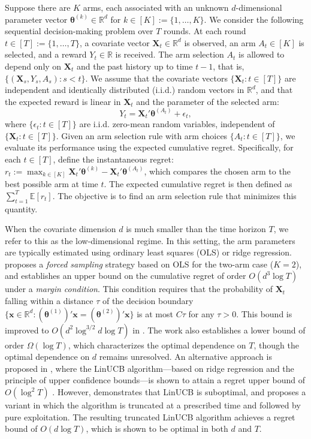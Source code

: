 \documentclass[aos,preprint]{imsart}
\theoremstyle{plain}
\theoremstyle{definition}
\newcommand{\btheta}{\boldsymbol{\theta}}
\newcommand{\bX}{\boldsymbol{X}}
\newcommand{\bx}{\boldsymbol{x}}
\newcommand{\bR}{\mathbb{R}}
\begin{document}
Suppose there are $K$ arms, each associated with an unknown $d$-dimensional parameter vector $\btheta^{(k)} \in \bR^{d}$ for $k \in [K] := \{1,\ldots, K\}$. We consider the following sequential decision-making problem over $T$ rounds. At each round $t \in [T] := \{1,\ldots,T\}$, a covariate vector $\bX_t \in \bR^{d}$ is observed, an arm $A_t \in [K]$ is selected, and a reward $Y_t \in \bR$ is received. The arm selection $A_t$ is allowed to depend only on $\bX_t$ and the past history up to time $t-1$, that is, $\{(\bX_s, Y_s, A_s) : s < t\}$. We assume that the covariate vectors $\{\bX_t: t \in [T]\}$ are independent and identically distributed (i.i.d.) random vectors in $\bR^d$, and that the expected reward is linear in $\bX_t$ and the parameter of the selected arm:
\[
Y_t = \bX_t'\btheta^{(A_t)} + \epsilon_t,
\]
where $\{\epsilon_t: t \in [T]\}$ are i.i.d. zero-mean random variables, independent of $\{\bX_t: t \in [T]\}$. Given an arm selection rule with arm choices $\{A_t: t \in [T]\}$, we evaluate its performance using the expected cumulative regret. Specifically, for each $t \in [T]$, define the instantaneous regret:
$r_t := \max_{k \in [K]} \bX_t'\btheta^{(k)} - \bX_t'\btheta^{(A_t)}$, 
which compares the chosen arm to the best possible arm at time $t$. The expected cumulative regret is then defined as $\sum_{t=1}^T \mathbb{E}[r_t]$. The objective is to find an arm selection rule that minimizes this quantity. 


When the covariate dimension $d$ is much smaller than the time horizon $T$, we refer to this as the low-dimensional regime. In this setting, the arm parameters are typically estimated using ordinary least squares (OLS) or ridge regression. \cite{goldenshluger2013linear} proposes a \emph{forced sampling} strategy based on OLS for the two-arm case ($K = 2$), and establishes an upper bound on the cumulative regret of order $O(d^3 \log T)$ under a \emph{margin condition}. This condition requires that the probability of $\bX_t$ falling within a distance $\tau$ of the decision boundary $\{ \bx \in \mathbb{R}^d : (\btheta^{(1)})'\bx = (\btheta^{(2)})'\bx \}$ is at most $C \tau$ for any $\tau > 0$. This bound is improved to $O(d^2 \log^{3/2} d \log T)$ in \cite{bastani2020online}. The work \cite{goldenshluger2013linear} also establishes a lower bound of order $\Omega(\log T)$, which characterizes the optimal dependence on $T$, though the optimal dependence on $d$ remains unresolved. An alternative approach is proposed in \cite{abbasi2011improved}, where the LinUCB algorithm---based on ridge regression and the principle of upper confidence bounds---is shown to attain a regret upper bound of $O(\log^2 T)$ \citep{DBLP:journals/corr/abs-2002-05152}. However, \cite{song2022truncated} demonstrates that LinUCB is suboptimal, and proposes a variant in which the algorithm is truncated at a prescribed time and followed by pure exploitation. The resulting truncated LinUCB algorithm achieves a regret bound of $O(d \log T)$, which is shown to be optimal in both $d$ and $T$.  
\end{document}
